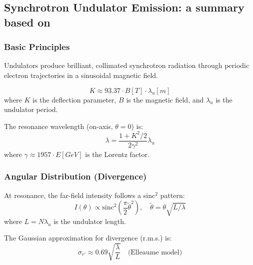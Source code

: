 
\subsection{Synchrotron Undulator Emission: a summary based on \cite{SanchezdelRioReyesHerrera2025}}

% 


\subsubsection{Basic Principles}

Undulators produce brilliant, collimated synchrotron radiation through periodic electron trajectories in a sinusoidal magnetic field.

\begin{equation}
K \approx 93.37 \cdot B[T] \cdot \lambda_u[m]
\end{equation}
where \(K\) is the deflection parameter, \(B\) is the magnetic field, and \(\lambda_u\) is the undulator period.

The resonance wavelength (on-axis, \(\theta=0\)) is:
\begin{equation}
\lambda = \frac{1 + K^2/2}{2\gamma^2} \lambda_u
\end{equation}
where \(\gamma \approx 1957 \cdot E[GeV]\) is the Lorentz factor.

\subsubsection{Angular Distribution (Divergence)}

At resonance, the far-field intensity follows a sinc\(^2\) pattern:
\begin{equation}
I(\theta) \propto \text{sinc}^2\left( \frac{\pi}{2} \tilde{\theta}^2 \right), \quad \tilde{\theta} = \theta \sqrt{L/\lambda}
\end{equation}
where \(L = N\lambda_u\) is the undulator length.

The Gaussian approximation for divergence (r.m.s.) is:
\begin{equation}\label{eq:elleaumeDivergence}
\sigma_{r'} \approx 0.69 \sqrt{\frac{\lambda}{L}} \quad \text{(Elleaume model)}
\end{equation}

